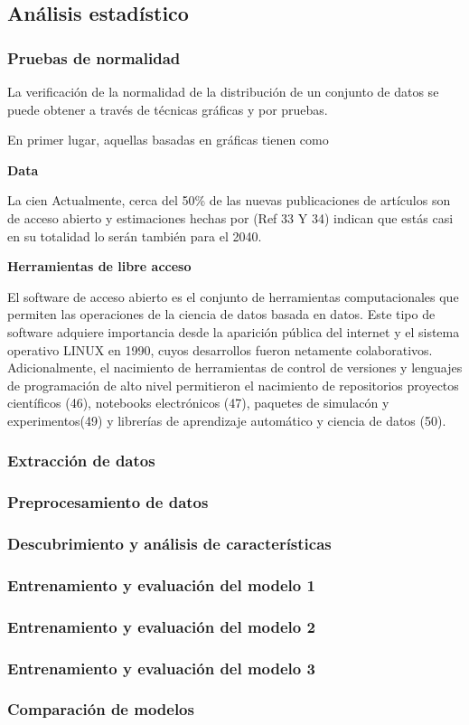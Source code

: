 \subsection{Análisis estadístico}

\subsubsection{Pruebas de normalidad}

La verificación de la normalidad de la distribución de un conjunto de datos se 
puede obtener a través de técnicas gráficas y por pruebas. 

En primer lugar, aquellas basadas en gráficas tienen como 

\textbf{Data}

La cien
Actualmente, cerca del 50\% de las nuevas publicaciones de artículos son de acceso abierto y estimaciones hechas por (Ref 33 Y 34) indican que 
estás casi en su totalidad lo serán también para el 2040.

\textbf{Herramientas de libre acceso}

El software de acceso abierto es el conjunto de herramientas computacionales que permiten 
las operaciones de la ciencia de datos basada en datos. Este tipo de software adquiere 
importancia desde la aparición pública del internet y el sistema operativo LINUX en 1990, 
cuyos desarrollos fueron netamente colaborativos. Adicionalmente, el nacimiento de 
herramientas de control de versiones y lenguajes de programación de alto nivel permitieron 
el nacimiento de repositorios proyectos científicos (46), notebooks electrónicos (47), 
paquetes de simulacón y experimentos(49) y librerías de aprendizaje automático y 
ciencia de datos (50). 


\subsubsection{Extracción de datos}

\subsubsection{Preprocesamiento de datos}
\subsubsection{Descubrimiento y análisis de características}
\subsubsection{Entrenamiento y evaluación del modelo 1}
\subsubsection{Entrenamiento y evaluación del modelo 2}
\subsubsection{Entrenamiento y evaluación del modelo 3}
\subsubsection{Comparación de modelos}
